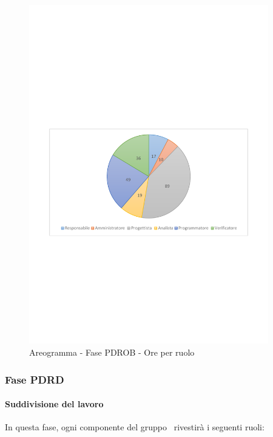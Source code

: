 \documentclass[../PianoProgetto.tex]{subfiles}
\begin{document}
	\begin{figure}[!h]
		\centering
		\includegraphics[width=0.93\textwidth , trim=2cm 9.5cm 2cm 11cm]{grafici/PDROB/PDROB-ore-ruolo}
			\caption{Areogramma - Fase PDROB - Ore per ruolo}
		\label{fig:CircleChart-fasePDROB_ore_r}
	\end{figure}
\vfill	
\newpage	
	
	\subsubsection{Fase PDRD}
				\paragraph{Suddivisione del lavoro}
					In questa fase, ogni componente del gruppo \leaf\ rivestirà i seguenti ruoli:
	
\end{document}
